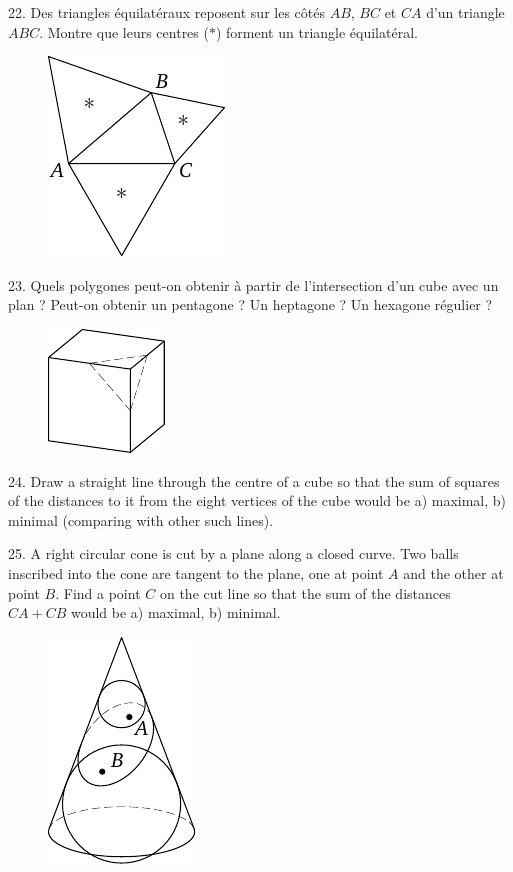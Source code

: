 \begin{problem}{22.}
	Des triangles équilatéraux reposent sur les côtés $AB$, $BC$ et $CA$ 
	d'un triangle $ABC$.
	Montre que leurs centres ($*$) forment un triangle équilatéral.
	\begin{figure}
		\includegraphics{resources/taskbook-6}
	\end{figure}
\end{problem}

\begin{problem}{23.}
	Quels polygones peut-on obtenir à partir de l'intersection d'un cube 
	avec un plan ?
	Peut-on obtenir un pentagone ? Un heptagone ? Un hexagone régulier ?
	\begin{figure}
		\includegraphics{resources/taskbook-7}
	\end{figure}
\end{problem}

\begin{problem}{24.}
	Draw a straight line through the centre of a cube so that the sum of squares of the distances to it
	from the eight vertices of the cube would be
	a) maximal,
	b) minimal (comparing with other such lines).
\end{problem}

\begin{problem}{25.}
	A right circular cone is cut by a plane along a closed curve. Two balls inscribed into the cone
	are tangent to the plane, one at point $A$ and the other at point $B$. Find a point $C$ on the cut line so
	that the sum of the distances $CA + CB$ would be a) maximal, b) minimal.
	\begin{figure}
		\includegraphics{resources/taskbook-9}
	\end{figure}
\end{problem}

